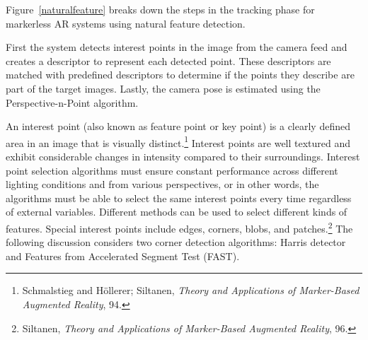 Figure~\ref{naturalfeature} breaks down the steps in the tracking phase for markerless AR systems using natural feature detection.

\begin{figure}[!ht]
\end{figure}
First the system detects interest points in the image from the camera feed and creates a descriptor to represent each detected point. These descriptors are matched with predefined descriptors to determine if the points they describe are part of the target images. Lastly, the camera pose is estimated using the Perspective-n-Point algorithm.

An interest point (also known as feature point or key point) is a clearly defined area in an image that is visually distinct.\footnote{Schmalstieg and Höllerer; Siltanen, \textit{Theory and Applications of Marker-Based Augmented Reality}, 94.} Interest points are well textured and exhibit considerable changes in intensity compared to their surroundings. Interest point selection algorithms must ensure constant performance across different lighting conditions and from various perspectives, or in other words, the algorithms must be able to select the same interest points every time regardless of external variables. Different methods can be used to select different kinds of features. Special interest points include edges, corners, blobs, and patches.\footnote{Siltanen, \textit{Theory and Applications of Marker-Based Augmented Reality}, 96.} The following discussion considers two corner detection algorithms:  Harris detector and Features from Accelerated Segment Test (FAST).

